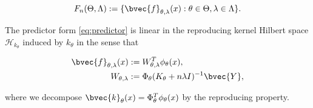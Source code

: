 \documentclass{article}
\begin{document}
		\begin{equation}
			F_{n}(\Theta, \Lambda) := \{ \bvec{f}_{\theta, \lambda}(x) : \theta \in \Theta, \lambda \in \Lambda \}.
		\label{eq:predictor_class}
		\end{equation}
		
		The predictor form \eqref{eq:predictor} is linear in the reproducing kernel Hilbert space $\mathcal{H}_{k_{\theta}}$ induced by $k_{\theta}$ in the sense that
		
		\begin{equation}
			\begin{aligned}
				\bvec{f}_{\theta, \lambda}(x) &:= W_{\theta, \lambda}^{T} \phi_{\theta}(x), \\
				W_{\theta, \lambda} &:= \Phi_{\theta} (K_{\theta} + n \lambda I)^{-1} \bvec{Y},
			\end{aligned}
		\label{eq:linear_predictor}
		\end{equation}
		
		where we decompose $\bvec{k}_{\theta}(x) = \Phi_{\theta}^{T} \phi_{\theta}(x)$ by the reproducing property. 
		
\end{document}
